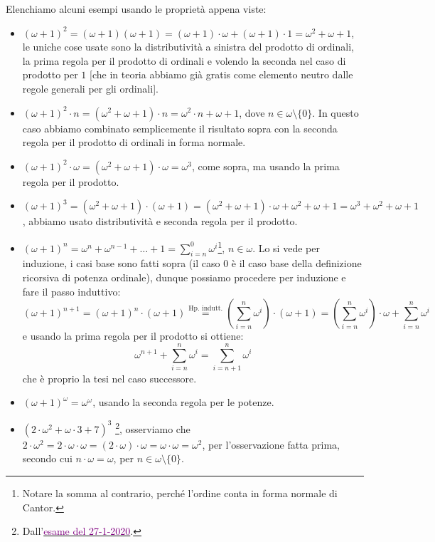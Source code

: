 \documentclass[11pt]{scrartcl}
\begin{document}
\begin{example}
	Elenchiamo alcuni esempi usando le proprietà appena viste:
	\begin{itemize}
		\item $(\omega + 1)^2 = (\omega + 1)(\omega + 1) = (\omega + 1)\cdot \omega + (\omega + 1) \cdot 1 = \omega^2 + \omega + 1$, le uniche cose usate sono la distributività a sinistra del prodotto di ordinali, la prima regola per il prodotto di ordinali e volendo la seconda nel caso di prodotto per $1$ [che in teoria abbiamo già gratis come elemento neutro dalle regole generali per gli ordinali].
		\item $(\omega + 1)^2 \cdot n = (\omega^2 + \omega + 1) \cdot n = \omega^2 \cdot n + \omega + 1$, dove $n \in \omega\setminus\{0\}$. In questo caso abbiamo combinato semplicemente il risultato sopra con la seconda regola per il prodotto di ordinali in forma normale.
		\item $(\omega + 1)^2 \cdot \omega = (\omega^2 + \omega + 1) \cdot \omega = \omega^3$, come sopra, ma usando la prima regola per il prodotto.
		\item $(\omega + 1)^3 = (\omega^2 + \omega + 1) \cdot (\omega + 1) = (\omega^2 + \omega + 1) \cdot \omega + \omega^2 + \omega + 1 = \omega^3 + \omega^2 + \omega + 1$, abbiamo usato distributività e seconda regola per il prodotto.
		\item $(\omega + 1)^n = \omega^n + \omega^{n - 1} + \ldots + 1 = \sum_{i = n}^0 \omega^i$\footnote{Notare la somma al contrario, perché l'ordine conta in forma normale di Cantor.}, $n \in \omega$. Lo si vede per induzione, i casi base sono fatti sopra (il caso 0 è il caso base della definizione ricorsiva di potenza ordinale), dunque possiamo procedere per induzione e fare il passo induttivo:
		\[ (\omega + 1)^{n + 1} = (\omega + 1)^n \cdot (\omega + 1) \overset{\text{Hp. indutt.}}{=} \left(\sum_{i = n}^n \omega^i\right) \cdot (\omega + 1) = \left(\sum_{i = n}^n \omega^i\right) \cdot \omega + \sum_{i = n}^n \omega^i
			\]
		e usando la prima regola per il prodotto si ottiene:
		\[ \omega^{n + 1} + \sum_{i = n}^n \omega^i = \sum_{i = n + 1}^n \omega^i
			\]
		che è proprio la tesi nel caso successore.
		\item $(\omega + 1)^\omega = \omega^\omega$, usando la seconda regola per le potenze.
		\item $(2 \cdot \omega^2 + \omega \cdot 3 + 7)^3$ \footnote{Dall'\href{https://ciovil.li/eti20/exam05.pdf}{\textcolor{purple}{esame del 27-1-2020}}.}, osserviamo che $2 \cdot \omega^2 = 2 \cdot \omega \cdot \omega = (2 \cdot \omega) \cdot \omega = \omega \cdot \omega = \omega^2$, per l'osservazione fatta prima, secondo cui $n \cdot \omega = \omega$, per $n \in \omega\setminus\{0\}$.

\end{itemize}
\end{example}
\end{document}
